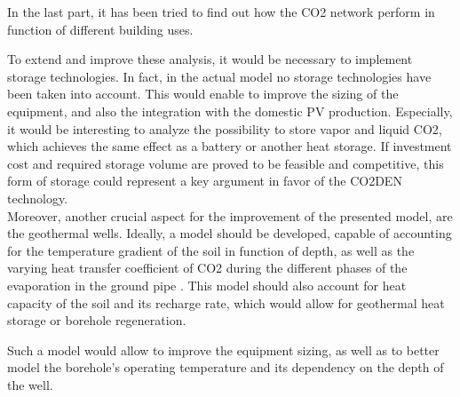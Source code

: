\documentclass{article}
\begin{document}
In the last part, it has been tried to find out how the CO2 network perform in function of different building uses.




To extend and improve these analysis, it would be necessary to implement storage technologies. In fact, in the actual model no storage technologies have been taken into account. This would enable to improve the sizing of the equipment, and also the integration with the domestic PV production. Especially, it would be interesting to analyze the possibility to store vapor and liquid CO2, which achieves the same effect as a battery or another heat storage. If investment cost and required storage volume are proved to be feasible and competitive, this form of storage could represent a key argument in favor of the CO2DEN technology.\\

Moreover, another crucial aspect for the improvement of the presented model, are the geothermal wells. 
Ideally, a model should be developed, capable of accounting for the temperature gradient of the soil in function of depth, as well as the varying heat transfer coefficient of CO2 during the different phases of the evaporation in the ground pipe \cite{badacheExperimentalStudyCarbon2018,lamarcheReviewMethodsEvaluate2010}.
This model should also account for heat capacity of the soil and its recharge rate\cite{jiaReviewEffectiveThermal2019,lamarcheReviewMethodsEvaluate2010,zengHeatTransferAnalysis2003a}, which would allow for geothermal heat storage or borehole regeneration.

Such a model would allow to improve the equipment sizing, as well as to better model the borehole's operating temperature and its dependency on the depth of the well.
 

\clearpage


\clearpage



\end{document}
